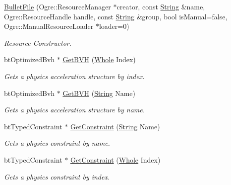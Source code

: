 \begin{DoxyCompactItemize}
\item 
\hyperlink{classphys_1_1internal_1_1BulletFile_aaedaa8c74984b1bdcd315eec9d592fbc}{BulletFile} (Ogre::ResourceManager $\ast$creator, const \hyperlink{namespacephys_aa03900411993de7fbfec4789bc1d392e}{String} \&name, Ogre::ResourceHandle handle, const \hyperlink{namespacephys_aa03900411993de7fbfec4789bc1d392e}{String} \&group, bool isManual=false, Ogre::ManualResourceLoader $\ast$loader=0)
\begin{DoxyCompactList}\small\item\em Resource Constructor. \item\end{DoxyCompactList}\item 
btOptimizedBvh $\ast$ \hyperlink{classphys_1_1internal_1_1BulletFile_a11b7d008dd86c69dda2caff4182efd0e}{GetBVH} (\hyperlink{namespacephys_a460f6bc24c8dd347b05e0366ae34f34a}{Whole} Index)
\begin{DoxyCompactList}\small\item\em Gets a physics acceleration structure by index. \item\end{DoxyCompactList}\item 
btOptimizedBvh $\ast$ \hyperlink{classphys_1_1internal_1_1BulletFile_a844ffb0876061c003b1f633f05de009a}{GetBVH} (\hyperlink{namespacephys_aa03900411993de7fbfec4789bc1d392e}{String} Name)
\begin{DoxyCompactList}\small\item\em Gets a physics acceleration structure by name. \item\end{DoxyCompactList}\item 
btTypedConstraint $\ast$ \hyperlink{classphys_1_1internal_1_1BulletFile_a6c0da3d085e5dddaa7f6fe3e916eacb4}{GetConstraint} (\hyperlink{namespacephys_aa03900411993de7fbfec4789bc1d392e}{String} Name)
\begin{DoxyCompactList}\small\item\em Gets a physics constraint by name. \item\end{DoxyCompactList}\item 
btTypedConstraint $\ast$ \hyperlink{classphys_1_1internal_1_1BulletFile_afa7216bc72f6e7cddca7817f26b9b642}{GetConstraint} (\hyperlink{namespacephys_a460f6bc24c8dd347b05e0366ae34f34a}{Whole} Index)
\begin{DoxyCompactList}\small\item\em Gets a physics constraint by index. \item\end{DoxyCompactList}\item 

\end{DoxyCompactItemize}
